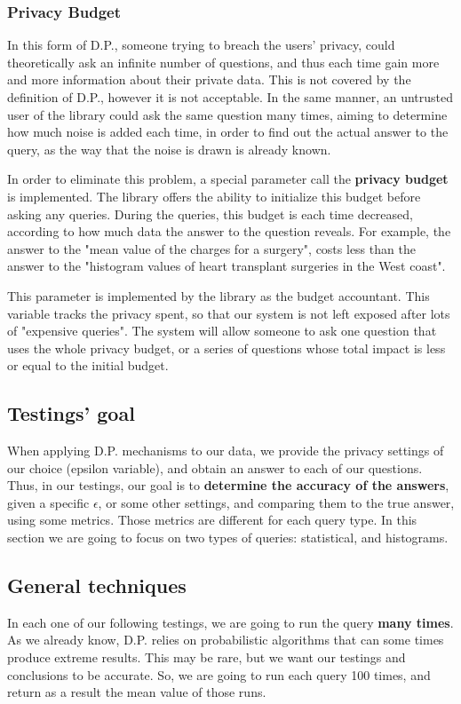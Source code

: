 \subsubsection{Privacy Budget}

In this form of D.P., someone trying to breach the users' privacy, could theoretically ask an infinite number of questions, and thus each time gain more and more information about their private data. This is not covered by the definition of D.P., however it is not acceptable. In the same manner, an untrusted user of the library could ask the same question many times, aiming to determine how much noise is added each time, in order to find out the actual answer to the query, as the way that the noise is drawn is already known.

In order to eliminate this problem, a special parameter call the \textbf{privacy budget} is implemented. The library offers the ability to initialize this budget before asking any queries. During the queries, this budget is each time decreased, according to how much data the answer to the question reveals. For example, the answer to the "mean value of the charges for a surgery", costs less than the answer to the "histogram values of heart transplant surgeries in the West coast".

This parameter is implemented by the library as the budget accountant. This variable tracks the privacy spent, so that our system is not left exposed after lots of "expensive queries". The system will allow someone to ask one question that uses the whole privacy budget, or a series of questions whose total impact is less or equal to the initial budget.

\subsection{Testings' goal}

When applying D.P. mechanisms to our data, we provide the privacy settings of our choice (epsilon variable), and obtain an answer to each of our questions. Thus, in our testings, our goal is to \textbf{determine the accuracy of the answers}, given a specific $\epsilon$, or some other settings, and comparing them to the true answer, using some metrics. Those metrics are different for each query type. In this section we are going to focus on two types of queries: statistical, and histograms.

\subsection{General techniques}
In each one of our following testings, we are going to run the query \textbf{many times}. As we already know, D.P. relies on probabilistic algorithms that can some times produce extreme results. This may be rare, but we want our testings and conclusions to be accurate. So, we are going to run each query 100 times, and return as a result the mean value of those runs.

